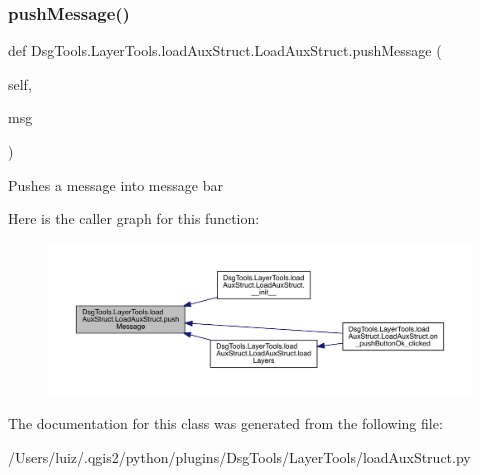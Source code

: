 \subsubsection{\texorpdfstring{push\+Message()}{pushMessage()}}
{\footnotesize\ttfamily def Dsg\+Tools.\+Layer\+Tools.\+load\+Aux\+Struct.\+Load\+Aux\+Struct.\+push\+Message (\begin{DoxyParamCaption}\item[{}]{self,  }\item[{}]{msg }\end{DoxyParamCaption})}

\begin{DoxyVerb}Pushes a message into message bar
\end{DoxyVerb}
 Here is the caller graph for this function\+:
\nopagebreak
\begin{figure}[H]
\begin{center}
\leavevmode
\includegraphics[width=350pt]{class_dsg_tools_1_1_layer_tools_1_1load_aux_struct_1_1_load_aux_struct_ae6bbe53e9fa99df9dd668fbbba6e3965_icgraph}
\end{center}
\end{figure}


The documentation for this class was generated from the following file\+:\begin{DoxyCompactItemize}
\item 
/\+Users/luiz/.\+qgis2/python/plugins/\+Dsg\+Tools/\+Layer\+Tools/load\+Aux\+Struct.\+py\end{DoxyCompactItemize}
